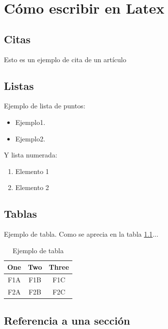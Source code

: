 \chapter{Cómo escribir en Latex}

\section{Citas}


Esto es un ejemplo de cita de un artículo %


\section{Listas}

Ejemplo de lista de puntos:
\begin{itemize}
\item Ejemplo1.
\item Ejemplo2.
\end{itemize} 

Y lista numerada:
\begin{enumerate}
\item Elemento 1
\item Elemento 2
\end{enumerate}

\section{Tablas}

Ejemplo de tabla. Como se aprecia en la tabla \ref{tab:table_example}...
\begin{table}[tb]
\caption{Ejemplo de tabla}
\label{tab:table_example}
\begin{center}
\begin{tabular}{|c||c|c|}
\hline
One & Two & Three\\
\hline
F1A & F1B & F1C\\
F2A & F2B & F2C\\
\hline
\end{tabular}
\end{center}
\end{table}

\section{Referencia a una sección}
\label{sec:refsec}

